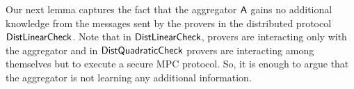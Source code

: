 \begin{comment}
\item Oracle Answers: The oracle responds with columns $\pi[\cdot,k]$ for $k\in
Q$.
\item $\verifier$ checks: The verifier checks $\sum_{i\in
[p]}r_i\pi[i,k]=\sum_{i\in [\ell]}\mc{T}[i,k]\tilde{c}_i$ for $k\in Q$.
\item $\verifier$ accepts if the above check succeeds and $b=1$. 
\end{enumerate}
\end{itemize}
\end{framed}
\caption{Distributed 3D Proximity Protocol}
\label{fig:distprox3d}
\end{figure}
\end{comment} 

Our next lemma captures the fact that the aggregator $\mathsf{A}$ gains no additional
knowledge from the messages sent by the provers in the distributed protocol
$\mathsf{DistLinearCheck}$. Note that in $\mathsf{DistLinearCheck}$, provers are interacting only with the aggregator and in $\mathsf{DistQuadraticCheck}$ provers are interacting among themselves but to execute a secure MPC protocol. So, it is enough to argue that the aggregator is not learning any additional information.

